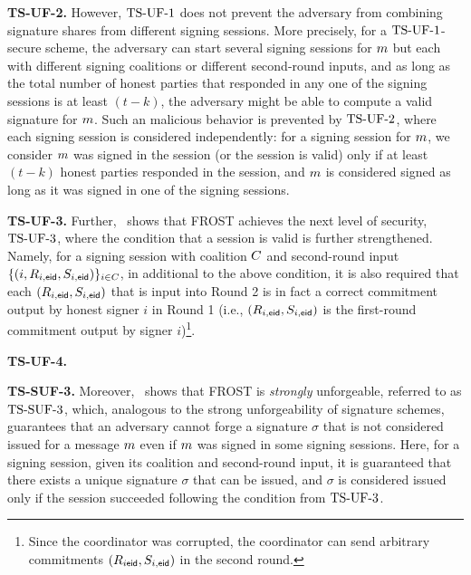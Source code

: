 \textbf{TS-UF-2.} However, $\mathrm{TS}\mbox{-}\mathrm{UF}\mbox{-}{1}$ does not prevent the adversary from combining signature shares from different signing sessions.
More precisely, for a $\mathrm{TS}\mbox{-}\mathrm{UF}\mbox{-}{1}$-secure scheme, the adversary can start several signing sessions for $m$ but each with different signing coalitions or different second-round inputs,
and as long as the total number of honest parties that responded in any one of the signing sessions is at least $(t-k)$, the adversary might be able to compute a valid signature for $m$.
Such an malicious behavior is prevented by $\mathrm{TS}\mbox{-}\mathrm{UF}\mbox{-}{2}$, where each signing session is considered independently:
for a signing session for $m$, we consider $m$ was signed in the session (or the session is valid) only if at least $(t - k)$ honest parties responded in the session, and $m$ is considered signed as long as it was signed in one of the signing sessions.

\medskip

\textbf{TS-UF-3.} Further,~\cite{BellareCKMTZ22} shows that FROST achieves the next level of security, $\mathrm{TS}\mbox{-}\mathrm{UF}\mbox{-}{3}$, where the condition that a session is valid is further strengthened.
Namely, for a signing session with coalition $C$ and second-round  input $\{ (i, R_{i,\mathsf{eid}}, S_{i,\mathsf{eid}})\}_{i \in C}$,
in additional to the above condition, it is also required that each
$(R_{i,\mathsf{eid}}, S_{i,\mathsf{eid}})$ that is input into Round 2 is in fact a correct commitment output by honest signer $i$ in Round 1 (i.e., $(R_{i,\mathsf{eid}}, S_{i,\mathsf{eid}})$ is the first-round commitment output by signer $i$)\footnote{Since the coordinator was corrupted,  the coordinator can send arbitrary commitments $(R_{i\mathsf{eid}}, S_{i,\mathsf{eid}})$ in the second round.}.

\medskip

\textbf{TS-UF-4.}  

\medskip
\textbf{TS-SUF-3.} Moreover,~\cite{BellareCKMTZ22} shows that FROST is \emph{strongly} unforgeable, referred to as $\mathrm{TS}\mbox{-}\mathrm{SUF}\mbox{-}{3}$, which, analogous to the strong unforgeability of signature schemes, guarantees that an adversary cannot forge a signature $\sigma$ that is not considered issued for a message $m$ even if $m$ was signed in some signing sessions. Here, for a signing session, given its coalition and second-round input, it is guaranteed that there exists a unique signature $\sigma$ that can be issued, and $\sigma$ is considered issued only if the session succeeded following the condition from $\mathrm{TS}\mbox{-}\mathrm{UF}\mbox{-}{3}$.




